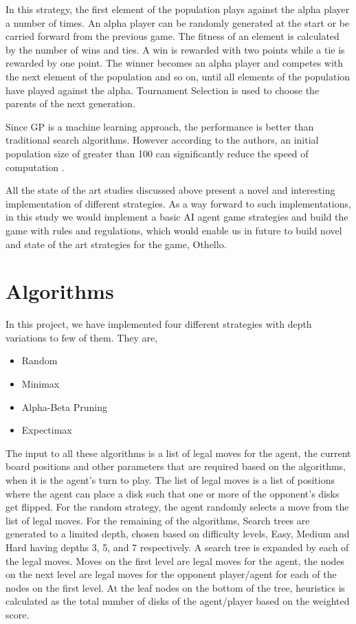 \documentclass{svproc}
\begin{document}
In this strategy, the first element of the population plays against the alpha player a number of times. An alpha player can be randomly generated at the start or be carried forward from the previous game. The fitness of an element is calculated by the number of wins and ties. A win is rewarded with two points while a tie is rewarded by one point. The winner becomes an alpha player and competes with the next element of the population and so on, until all elements of the population have played against the alpha. Tournament Selection is used to choose the parents of the next generation.

Since GP is a machine learning approach, the performance is better than traditional search algorithms. However according to the authors, an initial population size of greater than 100 can significantly reduce the speed of computation \cite{hema_1}.

All the state of the art studies discussed above present a novel and interesting implementation of different strategies. As a way forward to such implementations, in this study we would implement a basic AI agent game strategies and build the game with rules and regulations, which would enable us in future to build novel and state of the art strategies for the game, Othello.

\section{Algorithms}\label{3}

In this project, we have implemented four different strategies with depth variations to few of them. They are,

\begin{itemize}
    \item Random
    \item Minimax
    \item Alpha-Beta Pruning
    \item Expectimax
\end{itemize}

The input to all these algorithms is a list of legal moves for the agent, the current board positions and other parameters that are required based on the algorithms, when it is the agent’s turn to play. The list of legal moves is a list of positions where the agent can place a disk such that one or more of the opponent’s disks get flipped. For the random strategy, the agent randomly selects a move from the list of legal moves. For the remaining of the algorithms, Search trees are generated to a limited depth, chosen based on difficulty levels, Easy, Medium and Hard having depths 3, 5, and 7 respectively. A  search tree is expanded by each of the legal moves. Moves on the first level are legal moves for the agent, the nodes on the next level are legal moves for the opponent player/agent for each of the nodes on the first level. At the leaf nodes on the bottom of the tree, heuristics is calculated as the total number of disks of the agent/player based on the weighted score.
\end{document}
